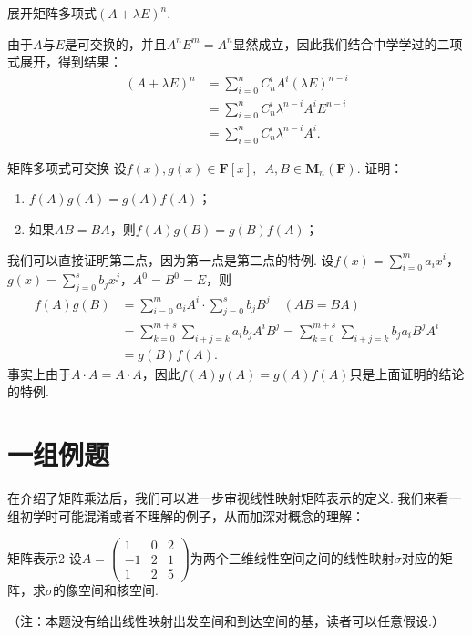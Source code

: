 \begin{example}{}{}
    展开矩阵多项式$(A+\lambda E)^n$.
\end{example}

\begin{solution}
    由于$A$与$E$是可交换的，并且$A^nE^m=A^n$显然成立，因此我们结合中学学过的二项式展开，得到结果：
    \begin{align*}
        (A+\lambda E)^n & =\sum_{i=0}^nC_n^iA^i(\lambda E)^{n-i}    \\
                        & =\sum_{i=0}^nC_n^i\lambda^{n-i}A^iE^{n-i} \\
                        & =\sum_{i=0}^nC_n^i\lambda^{n-i}A^i.
    \end{align*}
\end{solution}

\begin{example}{}{矩阵多项式可交换}
    设$f(x),g(x) \in \mathbf{F}[x],\enspace A,B \in \mathbf{M}_n(\mathbf{F})$. 证明：
    \begin{enumerate}
        \item $f(A)g(A)=g(A)f(A)$；

        \item 如果$AB=BA$，则$f(A)g(B)=g(B)f(A)$；
    \end{enumerate}
\end{example}

\begin{solution}
    我们可以直接证明第二点，因为第一点是第二点的特例. 设$f(x)=\displaystyle\sum_{i=0}^ma_ix^i$，$g(x)=\displaystyle\sum_{j=0}^sb_jx^j$，$A^0=B^0=E$，则
    \begin{align*}
        f(A)g(B) & =\sum_{i=0}^ma_iA^i\cdot \sum_{j=0}^sb_jB^j\quad(AB=BA)                            \\
                 & =\sum_{k=0}^{m+s}\sum_{i+j=k}a_ib_jA^iB^j=\sum_{k=0}^{m+s}\sum_{i+j=k}b_ja_iB^jA^i \\
                 & =g(B)f(A).
    \end{align*}
    事实上由于$A\cdot A=A\cdot A$，因此$f(A)g(A)=g(A)f(A)$只是上面证明的结论的特例.
\end{solution}

\section{一组例题}

在介绍了矩阵乘法后，我们可以进一步审视线性映射矩阵表示的定义. 我们来看一组初学时可能混淆或者不理解的例子，从而加深对概念的理解：
\begin{example}{}{矩阵表示2}
    设$A=\begin{pmatrix}1 & 0 & 2 \\ -1 & 2 & 1 \\ 1 & 2 & 5\end{pmatrix}$为两个三维线性空间之间的线性映射$\sigma$对应的矩阵，求$\sigma$的像空间和核空间.
\end{example}
（注：本题没有给出线性映射出发空间和到达空间的基，读者可以任意假设.）

